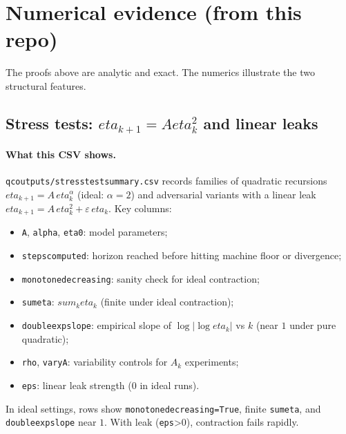\documentclass[11pt]{article}
\def\eta{eta}%
\def\sum{sum}%
\def\_{}%
\theoremstyle{definition}
\theoremstyle{remark}
\newcommand{\1}{\mathbbm{1}}
\newcommand{\pdfmath}[2]{\texorpdfstring{#1}{#2}}
\begin{document}
\section{Numerical evidence (from this repo)}
The proofs above are analytic and exact. The numerics illustrate the two structural features.

\subsection{Stress tests: \pdfmath{$\eta_{k+1}=A\eta_k^2$}{quadratic} and linear leaks}

\paragraph{What this CSV shows.}
\texttt{qc\_outputs/stress\_test\_summary.csv} records families of quadratic recursions
\(\eta_{k+1}=A\,\eta_k^\alpha\) (ideal: \(\alpha=2\)) and adversarial variants with a linear leak
\(\eta_{k+1}=A\,\eta_k^2+\varepsilon\,\eta_k\).
Key columns:
\begin{itemize}[leftmargin=2em]
  \item \texttt{A}, \texttt{alpha}, \texttt{eta0}: model parameters;
  \item \texttt{steps\_computed}: horizon reached before hitting machine floor or divergence;
  \item \texttt{monotone\_decreasing}: sanity check for ideal contraction;
  \item \texttt{sum\_eta}: $\sum_k \eta_k$ (finite under ideal contraction);
  \item \texttt{double\_exp\_slope}: empirical slope of $\log|\log \eta_k|$ vs $k$ (near $1$ under pure quadratic);
  \item \texttt{rho}, \texttt{vary\_A}: variability controls for $A_k$ experiments;
  \item \texttt{eps}: linear leak strength ($0$ in ideal runs).
\end{itemize}
In ideal settings, rows show \texttt{monotone\_decreasing=True}, finite \texttt{sum\_eta}, and \texttt{double\_exp\_slope} near $1$. With leak (\texttt{eps}>0), contraction fails rapidly.
\end{document}
